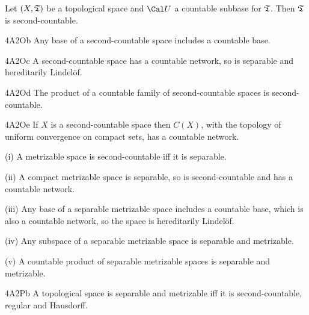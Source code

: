 Let $(X,\frak T)$ be a
topological space and $\Cal U$ a countable subbase for $\frak T$.
Then $\frak T$ is second-countable.

\spheader 4A2Ob Any base of a second-countable space includes a
countable base.

\spheader 4A2Oc A second-countable space has a countable
network, so is separable
and hereditarily Lindel\"of.

\spheader 4A2Od The product of a countable family of second-countable
spaces is second-countable.

\spheader 4A2Oe If $X$ is a second-countable space then $C(X)$, with the
topology of uniform convergence on compact sets, has a
countable network.   

(i) A metrizable space is
second-countable iff it is separable.

\quad(ii) A compact metrizable space is separable, so is second-countable and has
a countable network.

\quad(iii)
Any base of a separable metrizable space includes a countable
base,
which is also a countable network,
so the space is hereditarily Lindel\"of.

\quad(iv)
Any subspace of a separable metrizable space is separable and
metrizable.

\quad(v)
A countable product of separable metrizable spaces is separable and
metrizable.

\spheader 4A2Pb A topological space is separable and metrizable iff it
is second-countable, regular and Hausdorff.

